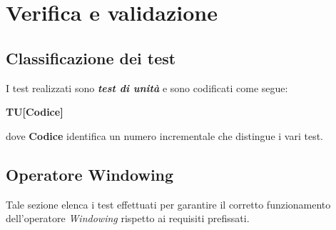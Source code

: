 
\chapter{Verifica e validazione}
\label{cap:verifica-validazione}



\section{Classificazione dei test}
I test realizzati sono \textbf{\textit{test di unità}} e sono codificati come segue:
\begin{center}
\textbf{TU[Codice]}\\
\end{center}
dove \textbf{Codice} identifica un numero incrementale che distingue i vari test.

\section{Operatore Windowing}
Tale sezione elenca i test effettuati per garantire il corretto funzionamento dell'operatore \textit{Windowing} rispetto ai requisiti prefissati.

